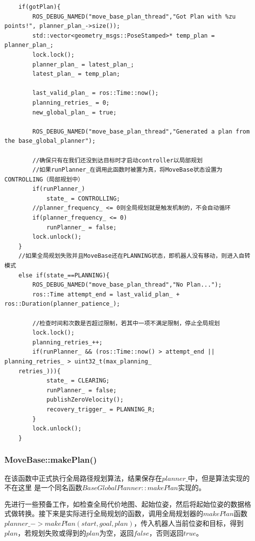 \documentclass[9pt, oneside]{book}
\begin{document}
\footnotesize
\begin{verbatim}
    if(gotPlan){
        ROS_DEBUG_NAMED("move_base_plan_thread","Got Plan with %zu points!", planner_plan_->size());
        std::vector<geometry_msgs::PoseStamped>* temp_plan = planner_plan_;
        lock.lock();
        planner_plan_ = latest_plan_;
        latest_plan_ = temp_plan;

        last_valid_plan_ = ros::Time::now();
        planning_retries_ = 0;
        new_global_plan_ = true;

        ROS_DEBUG_NAMED("move_base_plan_thread","Generated a plan from the base_global_planner");

        //确保只有在我们还没到达目标时才启动controller以局部规划
        //如果runPlanner_在调用此函数时被置为真，将MoveBase状态设置为CONTROLLING（局部规划中）
        if(runPlanner_)
            state_ = CONTROLLING;
        //planner_frequency_ <= 0则全局规划就是触发机制的，不会自动循环
        if(planner_frequency_ <= 0)
            runPlanner_ = false;
        lock.unlock();
    }
    //如果全局规划失败并且MoveBase还在PLANNING状态，即机器人没有移动，则进入自转模式
    else if(state_==PLANNING){
        ROS_DEBUG_NAMED("move_base_plan_thread","No Plan...");
        ros::Time attempt_end = last_valid_plan_ + ros::Duration(planner_patience_);

        //检查时间和次数是否超过限制，若其中一项不满足限制，停止全局规划
        lock.lock();
        planning_retries_++;
        if(runPlanner_ && (ros::Time::now() > attempt_end || planning_retries_ > uint32_t(max_planning_
    retries_))){
            state_ = CLEARING;
            runPlanner_ = false;
            publishZeroVelocity();
            recovery_trigger_ = PLANNING_R;
        }
        lock.unlock();
    }
\end{verbatim}
\normalsize

\subsubsection{MoveBase::makePlan()}

在该函数中正式执行全局路径规划算法，结果保存在$planner\_$中，但是算法实现的不在这里 是一个同名函数$BaseGlobalPlanner::makePlan$实现的。

先进行一些预备工作，如检查全局代价地图、起始位姿，然后将起始位姿的数据格式做转换。接下来是实际进行全局规划的函数，调用全局规划器的$makePlan$函数$planner\_->makePlan(start, goal, plan)$，传入机器人当前位姿和目标，得到$plan$，若规划失败或得到的$plan$为空，返回$false$，否则返回$true$。
\end{document}
